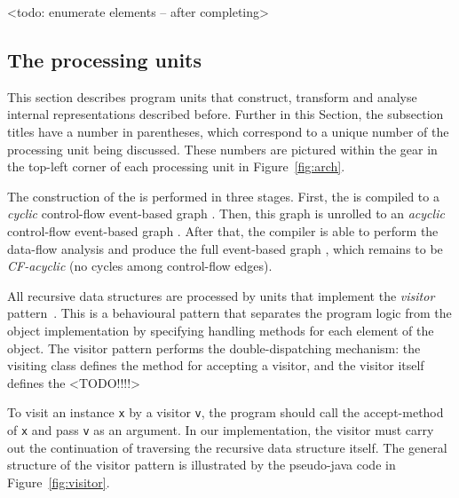 <todo: enumerate elements -- after completing>


\subsection{The processing units} %
\label{ch:impl:proc}


This section describes program units that construct, transform and analyse internal representations described before. %
Further in this Section, the subsection titles have a number in parentheses, which correspond to a unique number of the  processing unit being discussed.
These numbers are pictured within the gear in the top-left corner of each processing unit in Figure~\ref{fig:arch}.

The construction of the \xgraph{} is performed in three stages.
First, the \ytree{} is compiled to a \textit{cyclic} control-flow event-based graph \xgraph[CF].
Then, this graph is unrolled to an \textit{acyclic} control-flow event-based graph \xgraphU[CF].
After that, the compiler is able to perform the data-flow analysis and produce the full event-based graph \xgraphU[CF+DF], which remains to be \textit{CF-acyclic} (no cycles among control-flow edges).


All recursive data structures are processed by units that implement the \textit{visitor} pattern~\cite{palsberg1998essence}.
This is a behavioural pattern that separates the program logic from the object implementation by specifying handling methods for each element of the object.
The visitor pattern performs the double-dispatching mechanism: the visiting class defines the method for accepting a visitor, and the visitor itself defines the 
<TODO!!!!>

To visit an instance \lstinline{x} by a visitor \lstinline{v}, the program should call the accept-method of \lstinline{x} and pass \lstinline{v} as an argument.
In our implementation, the visitor must carry out the continuation of traversing the recursive data structure itself.
The general structure of the visitor pattern is illustrated by the pseudo-java code in Figure~\ref{fig:visitor}.

